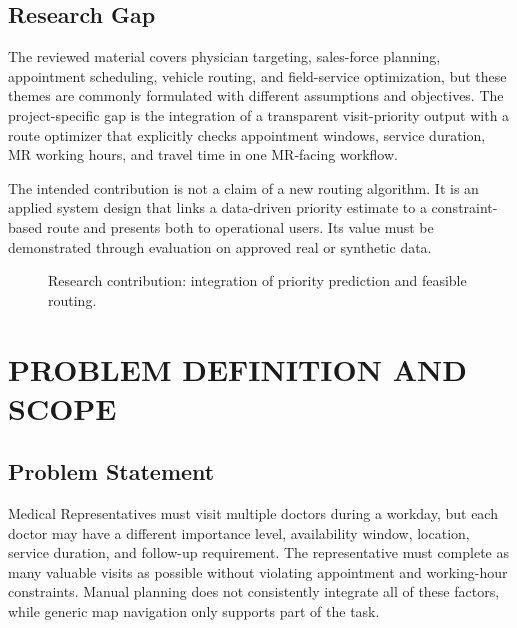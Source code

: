 \documentclass[12pt,a4paper,oneside]{report}
\begin{document}
\section{Research Gap}
The reviewed material covers physician targeting, sales-force planning, appointment scheduling, vehicle routing, and field-service optimization, but these themes are commonly formulated with different assumptions and objectives. The project-specific gap is the integration of a transparent visit-priority output with a route optimizer that explicitly checks appointment windows, service duration, MR working hours, and travel time in one MR-facing workflow.

The intended contribution is not a claim of a new routing algorithm. It is an applied system design that links a data-driven priority estimate to a constraint-based route and presents both to operational users. Its value must be demonstrated through evaluation on approved real or synthetic data.

\begin{figure}[htbp]
\centering
{}
\caption{Research contribution: integration of priority prediction and feasible routing.}
\label{fig:research-gap}
\end{figure}

\chapter{PROBLEM DEFINITION AND SCOPE}

\section{Problem Statement}
Medical Representatives must visit multiple doctors during a workday, but each doctor may have a different importance level, availability window, location, service duration, and follow-up requirement. The representative must complete as many valuable visits as possible without violating appointment and working-hour constraints. Manual planning does not consistently integrate all of these factors, while generic map navigation only supports part of the task.
\end{document}
